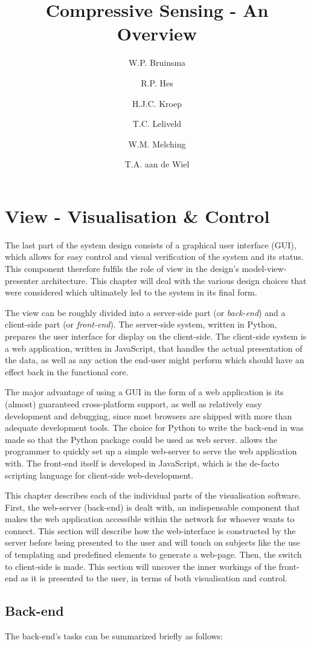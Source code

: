 \documentclass[a4paper, openany, oneside]{memoir}
\title{Compressive Sensing - An Overview}
\author{W.P. Bruinsma \and R.P. Hes \and H.J.C. Kroep \and T.C. Leliveld \and W.M. Melching \and T.A. aan de Wiel}
\begin{document}
\chapter{View - Visualisation \& Control}
\label{ch:visualisation}
The last part of the system design consists of a graphical user interface (GUI), which allows for easy control and visual verification of the system and its status. This component therefore fulfils the role of view in the design's model-view-presenter architecture. This chapter will deal with the various design choices that were considered which ultimately led to the system in its final form.

The view can be roughly divided into a server-side part (or \emph{back-end}) and a client-side part (or \emph{front-end}). The server-side system, written in Python, prepares the user interface for display on the client-side. The client-side system is a web application, written in JavaScript, that handles the actual presentation of the data, as well as any action the end-user might perform which should have an effect back in the functional core.

The major advantage of using a GUI in the form of a web application is its (almost) guaranteed cross-platform support, as well as relatively easy development and debugging, since most browsers are shipped with more than adequate development tools.
The choice for Python to write the back-end in was made so that the  Python package could be used as web server.  allows the programmer to quickly set up a simple web-server to serve the web application with.
The front-end itself is developed in JavaScript, which is the de-facto scripting language for client-side web-development.

This chapter describes each of the individual parts of the visualisation software.
First, the web-server (back-end) is dealt with, an indispensable component that makes the web application accessible within the network for whoever wants to connect. This section will describe how the web-interface is constructed by the server before being presented to the user and will touch on subjects like the use of templating and predefined elements to generate a web-page.
Then, the switch to client-side is made. This section will uncover the inner workings of the front-end as it is presented to the user, in terms of both visualisation and control.

\section{Back-end}
\label{sec:webserver}
The back-end's tasks can be summarized briefly as follows:
\end{document}
